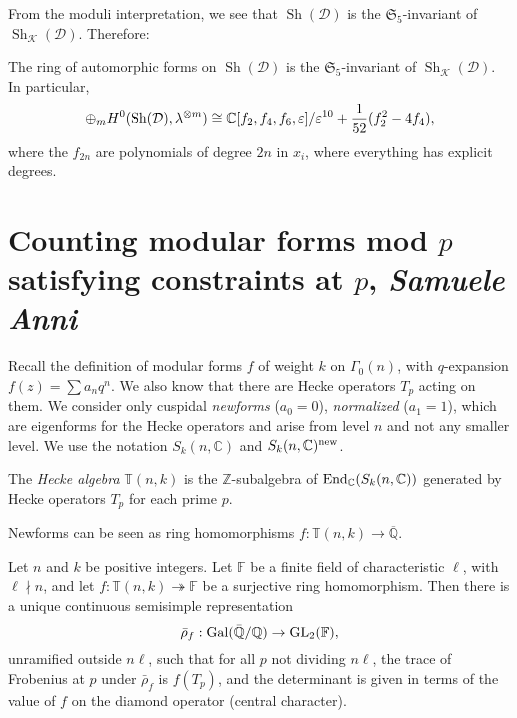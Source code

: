 \documentclass[reqno]{amsart} 
\begin{document}
From the moduli interpretation, we see that $\operatorname{Sh}(\mathcal{D})$ is the $\mathfrak{S}_5$-invariant of $\operatorname{Sh}_{\mathcal{K}}(\mathcal{D})$.   Therefore:
\begin{theorem}
  The ring of automorphic forms on $\operatorname{Sh}(\mathcal{D})$ is the $\mathfrak{S}_5$-invariant of $\operatorname{Sh}_{\mathcal{K}}(\mathcal{D})$.  In particular,
  \begin{equation*}
    \oplus_{m} H^0(\operatorname{Sh}(\mathcal{D}), \lambda^{\otimes m}) \cong \mathbb{C}[f_2, f_4, f_6, \varepsilon] / \varepsilon^{10}
    + \frac{1}{52}(f_2^2 - 4 f_4),
  \end{equation*}
  where the $f_{2n}$ are polynomials of degree $2 n$ in $x_i$, where everything has explicit degrees.
\end{theorem}

\section{Counting modular forms mod $p$ satisfying constraints at $p$, \textnormal{\emph{Samuele Anni}}}
Recall the definition of modular forms $f$ of weight $k$ on $\Gamma_0(n)$, with $q$-expansion $f(z) = \sum a_n q^n$.  We also know that there are Hecke operators $T_p$ acting on them.  We consider only cuspidal \emph{newforms} ($a_0 = 0$), \emph{normalized} ($a_1 = 1$), which are eigenforms for the Hecke operators and arise from level $n$ and not any smaller level.  We use the notation $S_k(n, \mathbb{C})$ and $S_k(n, \mathbb{C})^{\operatorname{new}}$.

\begin{definition}
  The \emph{Hecke algebra} $\mathbb{T}(n, k)$ is the $\mathbb{Z}$-subalgebra of $\operatorname{End}_{\mathbb{C}}(S_k(n, \mathbb{C}))$ generated by Hecke operators $T_p$ for each prime $p$.
\end{definition}

Newforms can be seen as ring homomorphisms $f : \mathbb{T}(n, k) \rightarrow \overline{\mathbb{Q}}$.

\begin{theorem}
  Let $n$ and $k$ be positive integers.  Let $\mathbb{F}$ be a finite field of characteristic $\ell$, with $\ell \nmid n$, and
  let $f : \mathbb{T}(n, k) \twoheadrightarrow \mathbb{F}$ be a surjective ring homomorphism.  Then there is a unique continuous semisimple representation
  \begin{equation*}
    \bar{\rho} _f : \operatorname{Gal}(\bar{\mathbb{Q}} / \mathbb{Q}) \rightarrow \operatorname{GL}_2(\mathbb{F}),
  \end{equation*}
  unramified outside $n \ell$, such that for all $p$ not dividing $n \ell$, the trace of Frobenius at $p$ under $\bar{\rho}_f$ is $f(T_p)$, and the determinant is given in terms of the value of $f$ on the diamond operator (central character).
\end{theorem}
\end{document}
